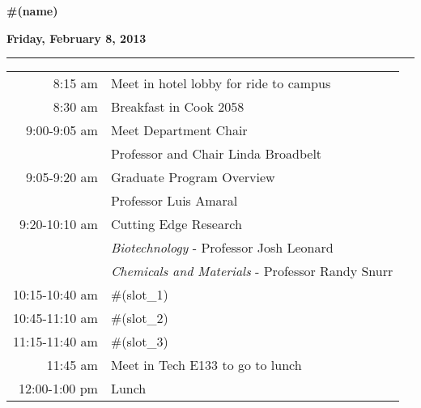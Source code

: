 \documentclass{article}
\begin{document}
\vspace*{0.25\baselineskip}
\textbf{\LARGE{#(name)}}
\vspace*{0.25\baselineskip}

\centerline{\textbf{Friday, February 8, 2013}}
\vspace*{0.25\baselineskip}
\hrule
\vspace*{0.25\baselineskip}

\hspace{4.6cm}
\begin{tabular}{ r    l }

8:15 am         & Meet in hotel lobby for ride to campus \rule{0cm}{0.5cm} \\

8:30 am         & Breakfast in Cook 2058 \rule{0cm}{0.4cm} \\ 

9:00-9:05 am    & Meet Department Chair \rule{0cm}{0.4cm} \\ 
                & \hspace{5mm} Professor and Chair Linda Broadbelt \\ 

9:05-9:20 am    & Graduate Program Overview \rule{0cm}{0.4cm} \\ 
                & \hspace{5mm} Professor Luis Amaral \\ 

9:20-10:10 am   & Cutting Edge Research \rule{0cm}{0.4cm} \\ 
                & \hspace{5mm} \textit{Biotechnology} - Professor Josh Leonard \\ 
                & \hspace{5mm} \textit{Chemicals and Materials} - Professor Randy Snurr \\

10:15-10:40 am  & #(slot_1) \rule{0cm}{0.4cm} \\ 

10:45-11:10 am  & #(slot_2) \rule{0cm}{0.4cm} \\ 

11:15-11:40 am  & #(slot_3) \rule{0cm}{0.4cm} \\ 

11:45 am        & Meet in Tech E133 to go to lunch \rule{0cm}{0.4cm} \\ 

12:00-1:00 pm   & Lunch \rule{0cm}{0.4cm} \\ 


\end{tabular}
\end{document}
